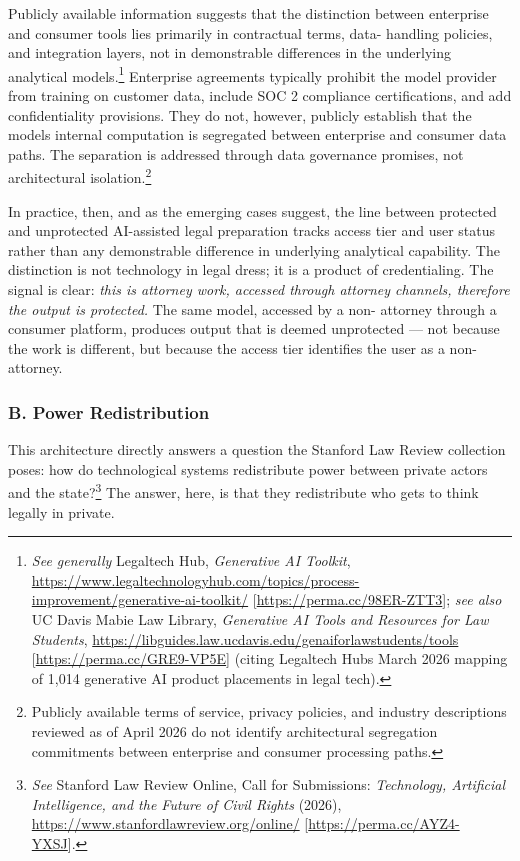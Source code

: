 \documentclass[
  12pt,
]{article}
\begin{document}
Publicly available information suggests that the distinction between
enterprise and consumer tools lies primarily in contractual terms, data-
handling policies, and integration layers, not in demonstrable
differences in the underlying analytical models.\footnote{\emph{See
  generally} Legaltech Hub, \emph{Generative AI Toolkit},
  \url{https://www.legaltechnologyhub.com/topics/process-improvement/generative-ai-toolkit/}
  {[}\url{https://perma.cc/98ER-ZTT3}{]}; \emph{see also} UC Davis Mabie
  Law Library, \emph{Generative AI Tools and Resources for Law
  Students},
  \url{https://libguides.law.ucdavis.edu/genaiforlawstudents/tools}
  {[}\url{https://perma.cc/GRE9-VP5E}{]} (citing Legaltech
  Hub\textquotesingle s March 2026 mapping of 1,014 generative AI
  product placements in legal tech).} Enterprise agreements typically
prohibit the model provider from training on customer data, include SOC
2 compliance certifications, and add confidentiality provisions. They do
not, however, publicly establish that the model\textquotesingle s
internal computation is segregated between enterprise and consumer data
paths. The separation is addressed through data governance promises, not
architectural isolation.\footnote{Publicly available terms of service,
  privacy policies, and industry descriptions reviewed as of April 2026
  do not identify architectural segregation commitments between
  enterprise and consumer processing paths.}

In practice, then, and as the emerging cases suggest, the line between
protected and unprotected AI-assisted legal preparation tracks access
tier and user status rather than any demonstrable difference in
underlying analytical capability. The distinction is not technology in
legal dress; it is a product of credentialing. The signal is clear:
\emph{this is attorney work, accessed through attorney channels,
therefore the output is protected.} The same model, accessed by a non-
attorney through a consumer platform, produces output that is deemed
unprotected --- not because the work is different, but because the
access tier identifies the user as a non-attorney.

\subsubsection{B. Power Redistribution}\label{b-power-redistribution}

This architecture directly answers a question the Stanford Law Review
collection poses: how do technological systems redistribute power
between private actors and the state?\footnote{\emph{See} Stanford Law
  Review Online, Call for Submissions: \emph{Technology, Artificial
  Intelligence, and the Future of Civil Rights} (2026),
  \url{https://www.stanfordlawreview.org/online/}
  {[}\url{https://perma.cc/AYZ4-YXSJ}{]}.} The answer, here, is that
they redistribute who gets to think legally in private.
\end{document}
